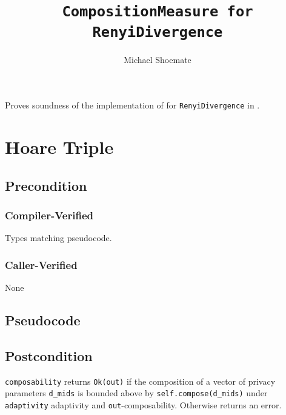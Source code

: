 \documentclass{article}
\title{\texttt{CompositionMeasure for RenyiDivergence}}
\author{Michael Shoemate}
\date{}
\begin{document}
\maketitle

\contrib
Proves soundness of the implementation of  
for \texttt{RenyiDivergence} in .

\section{Hoare Triple}
\subsection*{Precondition}
\subsubsection*{Compiler-Verified}
Types matching pseudocode.


\subsubsection*{Caller-Verified}
None

\subsection*{Pseudocode}


\subsection*{Postcondition}
\begin{theorem}
  \texttt{composability} returns \texttt{Ok(out)} if the composition of a vector of privacy parameters \texttt{d\_mids} 
  is bounded above by \texttt{self.compose(d\_mids)} under \texttt{adaptivity} adaptivity and \texttt{out}-composability.
  Otherwise returns an error.
\end{theorem}
\end{document}
